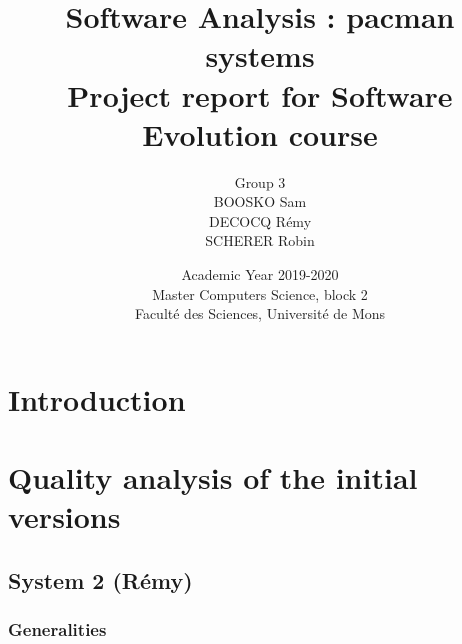 \documentclass[]{article}
\begin{document}
\title{
\vspace{1.6cm}
{\Huge Software Analysis : pacman systems}\\
\vspace{0.5cm}
{\Huge Project report for Software Evolution course}\vspace{1cm}\\
}


\author{
\vspace{1cm}
\huge{Group 3}\\
\Large{BOOSKO Sam}\\
\Large{DECOCQ Rémy}\\
\Large{SCHERER Robin}
}


\date{
\vspace{7.9cm}
Academic Year 2019-2020\\
Master Computers Science, block 2\\
Faculté des Sciences, Université de Mons}

\maketitle          

\thispagestyle{empty}   

\newpage

\tableofcontents
\newpage

\section*{Introduction}
\newpage
\section{Quality analysis of the initial versions}
\label{quality_analysis}

\subsection{System 2 (Rémy)}
\subsubsection{Generalities}
\end{document}
